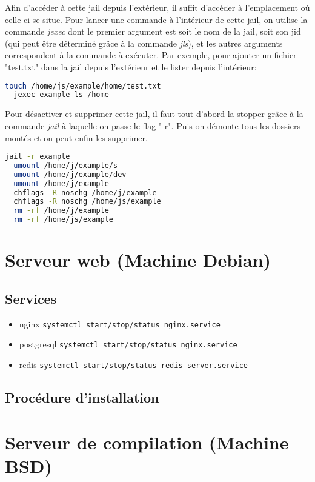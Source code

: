 \documentclass[10pt,a4paper]{article}
\begin{document}
Afin d'accéder à cette jail depuis l'extérieur, il suffit d'accéder à l'emplacement où celle-ci se situe. Pour lancer une commande à l'intérieur de cette jail, on utilise la commande \emph{jexec} dont le premier argument est soit le nom de la jail, soit son jid (qui peut être déterminé grâce à la commande \emph{jls}), et les autres arguments correspondent à la commande à exécuter. Par exemple, pour ajouter un fichier "test.txt" dans la jail depuis l'extérieur et le lister depuis l'intérieur:
\begin{lstlisting}[language=bash]
  touch /home/js/example/home/test.txt
  jexec example ls /home
\end{lstlisting}

Pour désactiver et supprimer cette jail, il faut tout d'abord la stopper grâce à la commande \emph{jail} à laquelle on passe le flag "-r". Puis on démonte tous les dossiers montés et on peut enfin les supprimer.
\begin{lstlisting}[language=bash]
  jail -r example
  umount /home/j/example/s
  umount /home/j/example/dev
  umount /home/j/example
  chflags -R noschg /home/j/example
  chflags -R noschg /home/js/example
  rm -rf /home/j/example
  rm -rf /home/js/example
\end{lstlisting}

\section{Serveur web (Machine Debian)}
\subsection{Services}
\begin{itemize}
    \item nginx \texttt{systemctl start/stop/status nginx.service}
    \item postgresql \texttt{systemctl start/stop/status nginx.service}
    \item redis \texttt{systemctl start/stop/status redis-server.service}
\end{itemize}

\subsection{Procédure d'installation}


\section{Serveur de compilation (Machine BSD)}
\end{document}
